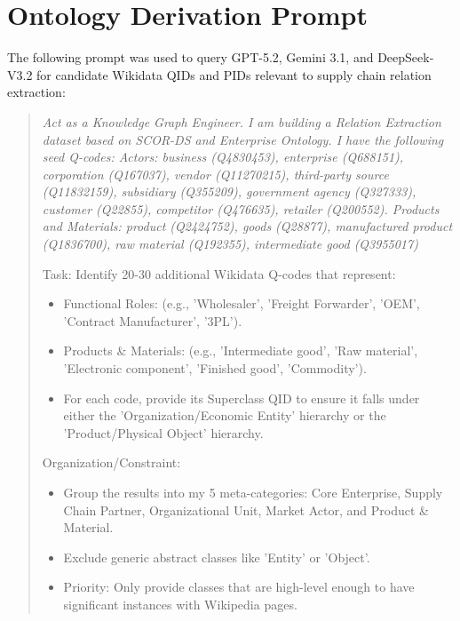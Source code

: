 \appendix

\section{Ontology Derivation Prompt}
\label{app:ontology_prompt}

The following prompt was used to query GPT-5.2, Gemini 3.1, and DeepSeek-V3.2
for candidate Wikidata QIDs and PIDs relevant to supply chain relation
extraction:

\begin{quote}
{\itshape 
Act as a Knowledge Graph Engineer. I am building a Relation Extraction dataset based on SCOR-DS and Enterprise Ontology.
I have the following seed Q-codes:
Actors: business (Q4830453), enterprise (Q688151), corporation (Q167037), vendor (Q11270215), third-party source (Q11832159), subsidiary (Q355209), government agency (Q327333), customer (Q22855), competitor (Q476635), retailer (Q200552).
Products and Materials:  product (Q2424752), goods (Q28877), manufactured product (Q1836700), raw material (Q192355), intermediate good (Q3955017)

Task: Identify 20-30 additional Wikidata Q-codes that represent:

    \begin{itemize}
        \item Functional Roles: (e.g., 'Wholesaler', 'Freight Forwarder', 'OEM', 'Contract Manufacturer', '3PL').
        \item Products \& Materials: (e.g., 'Intermediate good', 'Raw material', 'Electronic component', 'Finished good', 'Commodity').
        \item For each code, provide its Superclass QID to ensure it falls under either the 'Organization/Economic Entity' hierarchy or the 'Product/Physical Object' hierarchy.
    \end{itemize}

Organization/Constraint:

    \begin{itemize}
        \item Group the results into my 5 meta-categories: Core Enterprise, Supply Chain Partner, Organizational Unit, Market Actor, and Product \& Material.
        \item Exclude generic abstract classes like 'Entity' or 'Object'.
        \item Priority: Only provide classes that are high-level enough to have significant instances with Wikipedia pages.
    \end{itemize}}
\end{quote}


